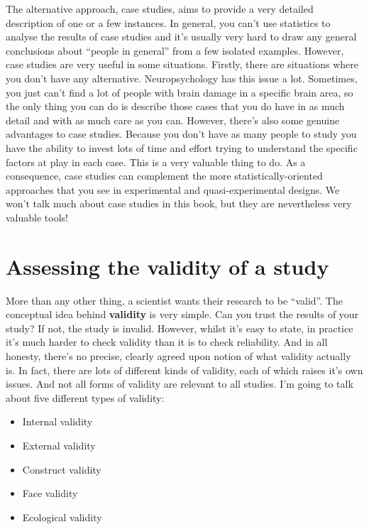 \documentclass[
]{book}
\providecommand{\tightlist}{%
  \setlength{\itemsep}{0pt}\setlength{\parskip}{0pt}}
\begin{document}
The alternative approach, case studies, aims to provide a very detailed description of one or a few instances. In general, you can't use statistics to analyse the results of case studies and it's usually very hard to draw any general conclusions about ``people in general'' from a few isolated examples. However, case studies are very useful in some situations. Firstly, there are situations where you don't have any alternative. Neuropsychology has this issue a lot. Sometimes, you just can't find a lot of people with brain damage in a specific brain area, so the only thing you can do is describe those cases that you do have in as much detail and with as much care as you can. However, there's also some genuine advantages to case studies. Because you don't have as many people to study you have the ability to invest lots of time and effort trying to understand the specific factors at play in each case. This is a very valuable thing to do. As a consequence, case studies can complement the more statistically-oriented approaches that you see in experimental and quasi-experimental designs. We won't talk much about case studies in this book, but they are nevertheless very valuable tools!

\hypertarget{assessing-the-validity-of-a-study}{%
\section{Assessing the validity of a study}\label{assessing-the-validity-of-a-study}}

More than any other thing, a scientist wants their research to be ``valid''. The conceptual idea behind \textbf{validity} is very simple. Can you trust the results of your study? If not, the study is invalid. However, whilst it's easy to state, in practice it's much harder to check validity than it is to check reliability. And in all honesty, there's no precise, clearly agreed upon notion of what validity actually is. In fact, there are lots of different kinds of validity, each of which raises it's own issues. And not all forms of validity are relevant to all studies. I'm going to talk about five different types of validity:

\begin{itemize}
\tightlist
\item
  Internal validity
\item
  External validity
\item
  Construct validity
\item
  Face validity
\item
  Ecological validity
\end{itemize}
\end{document}
